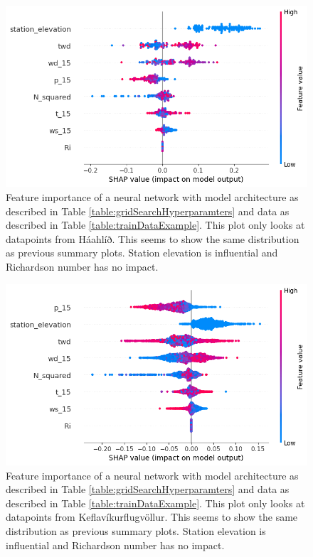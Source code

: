 \begin{figure}
    \centering
    \includegraphics[scale = 0.6]{Figures/shap_plots/summary_plot_1470.png}
    \caption[Summary feature importance of a neural network only looking at AWS at Háahlíð.]{Feature importance of a neural network with model architecture as described in Table \ref{table:gridSearchHyperparamters} and data as described in Table \ref{table:trainDataExample}. This plot only looks at datapoints from Háahlíð. This seems to show the same distribution as previous summary plots. Station elevation is influential and Richardson number has no impact.}
    \label{fig:ShapleySummaryHaahlid}
\end{figure}

\begin{figure}
    \centering
    \includegraphics[scale = 0.6]{Figures/shap_plots/summary_plot_1350.png}
    \caption[Summary feature importance of a neural network only looking at AWS at Keflavíkurflugvöllur.]{Feature importance of a neural network with model architecture as described in Table \ref{table:gridSearchHyperparamters} and data as described in Table \ref{table:trainDataExample}. This plot only looks at datapoints from Keflavíkurflugvöllur. This seems to show the same distribution as previous summary plots. Station elevation is influential and Richardson number has no impact.}
    \label{fig:ShapleySummaryKeflavikurflugvollur}
\end{figure}

